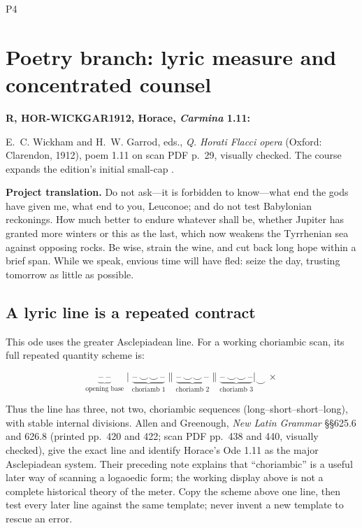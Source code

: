 \begin{courseunit}{P4}
\chapter{Poetry branch: lyric measure and concentrated counsel}

\textbf{R, HOR-WICKGAR1912, Horace, \textit{Carmina} 1.11:}
\begin{quote}
\PoetryHoraceCarminaOneEleven
\end{quote}

E.~C. Wickham and H.~W. Garrod, eds., \textit{Q. Horati Flacci opera}
(Oxford: Clarendon, 1912), poem 1.11 on scan PDF p.~29, visually checked. The
course expands the edition's initial small-cap .

\textbf{Project translation.} Do not ask---it is forbidden to know---what end
the gods have given me, what end to you, Leuconoe; and do not test Babylonian
reckonings. How much better to endure whatever shall be, whether Jupiter has
granted more winters or this as the last, which now weakens the Tyrrhenian sea
against opposing rocks. Be wise, strain the wine, and cut back long hope within
a brief span. While we speak, envious time will have fled: seize the day,
trusting tomorrow as little as possible.

\section{A lyric line is a repeated contract}

This ode uses the greater Asclepiadean line. For a working choriambic scan, its
full repeated quantity scheme is:

\[
\underbrace{\text{--}\;\text{--}}_{\text{opening base}}
\mid
\underbrace{\text{--}\,\smile\smile\,\text{--}}_{\text{choriamb 1}}
\parallel
\underbrace{\text{--}\,\smile\smile\,\text{--}}_{\text{choriamb 2}}
\parallel
\underbrace{\text{--}\,\smile\smile\,\text{--}}_{\text{choriamb 3}}
\mid
\smile\,\times
\]

Thus the line has three, not two, choriambic sequences
(long--short--short--long), with stable internal divisions. Allen and
Greenough, \textit{New Latin Grammar} \S\S625.6 and 626.8 (printed pp.~420 and
422; scan PDF pp.~438 and 440, visually checked), give the exact line and
identify Horace's Ode 1.11 as the major Asclepiadean system. Their preceding
note explains that ``choriambic'' is a useful later way of scanning a
logaoedic form; the working display above is not a complete historical theory
of the meter. Copy the scheme above one line, then test every later line
against the same template; never invent a new template to rescue an error.


\end{courseunit}
